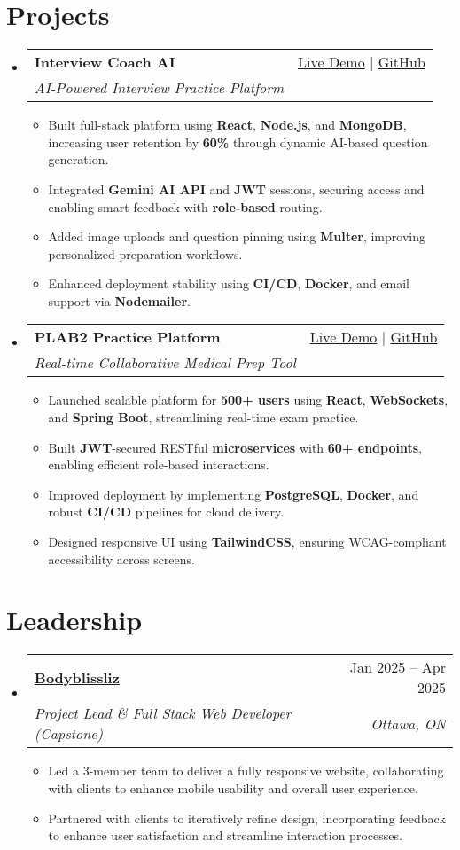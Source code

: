\documentclass[letterpaper,11pt]{article}
\makeatletter
\newcommand{\resumeItem}[1]{\item\small{#1 \vspace{-2pt}}}
\newcommand{\resumeSubheading}[4]{
  \vspace{-1pt}\item
    \begin{tabular*}{0.97\textwidth}[t]{l@{\extracolsep{\fill}}r}
      \textbf{#1} & #2 \\
      \textit{\small#3} & \textit{\small #4} \\
    \end{tabular*}\vspace{-5pt}
}
\newcommand{\resumeSubHeadingListStart}{\begin{itemize}[leftmargin=*]}
\newcommand{\resumeSubHeadingListEnd}{\end{itemize}}
\newcommand{\resumeItemListStart}{\begin{itemize}}
\newcommand{\resumeItemListEnd}{\end{itemize}\vspace{-5pt}}
\makeatother
\begin{document}
\section{Projects}
  \resumeSubHeadingListStart
    \resumeSubheading
      {\textbf{Interview Coach AI}}{\href{https://interviewcoach-ai.vercel.app}{Live Demo} | \href{https://github.com/altansaid/interviewcoach-ai}{GitHub}}
      {AI-Powered Interview Practice Platform}{}
      \resumeItemListStart
        \resumeItem{Built full-stack platform using \textbf{React}, \textbf{Node.js}, and \textbf{MongoDB}, increasing user retention by \textbf{60\%} through dynamic AI-based question generation.}
        \resumeItem{Integrated \textbf{Gemini AI API} and \textbf{JWT} sessions, securing access and enabling smart feedback with \textbf{role-based} routing.}
        \resumeItem{Added image uploads and question pinning using \textbf{Multer}, improving personalized preparation workflows.}
        \resumeItem{Enhanced deployment stability using \textbf{CI/CD}, \textbf{Docker}, and email support via \textbf{Nodemailer}.}
      \resumeItemListEnd

    \resumeSubheading
      {\textbf{PLAB2 Practice Platform}}{\href{https://plab2practice.com}{Live Demo} | \href{https://github.com/altansaid/plab2projectnew}{GitHub}}
      {Real-time Collaborative Medical Prep Tool}{}
      \resumeItemListStart
        \resumeItem{Launched scalable platform for \textbf{500+ users} using \textbf{React}, \textbf{WebSockets}, and \textbf{Spring Boot}, streamlining real-time exam practice.}
        \resumeItem{Built \textbf{JWT}-secured RESTful \textbf{microservices} with \textbf{60+ endpoints}, enabling efficient role-based interactions.}
        \resumeItem{Improved deployment by implementing \textbf{PostgreSQL}, \textbf{Docker}, and robust \textbf{CI/CD} pipelines for cloud delivery.}
        \resumeItem{Designed responsive UI using \textbf{TailwindCSS}, ensuring WCAG-compliant accessibility across screens.}
      \resumeItemListEnd
  \resumeSubHeadingListEnd

\section{Leadership}
  \resumeSubHeadingListStart
    \resumeSubheading
      {\href{https://www.bodyblissliz.com}{Bodyblissliz}}{Jan 2025 -- Apr 2025}
      {Project Lead \& Full Stack Web Developer (Capstone)}{Ottawa, ON}
      \resumeItemListStart
        \resumeItem{Led a 3-member team to deliver a fully responsive website, collaborating with clients to enhance mobile usability and overall user experience.}
        \resumeItem{Partnered with clients to iteratively refine design, incorporating feedback to enhance user satisfaction and streamline interaction processes.}
      \resumeItemListEnd
  \resumeSubHeadingListEnd
\end{document}
